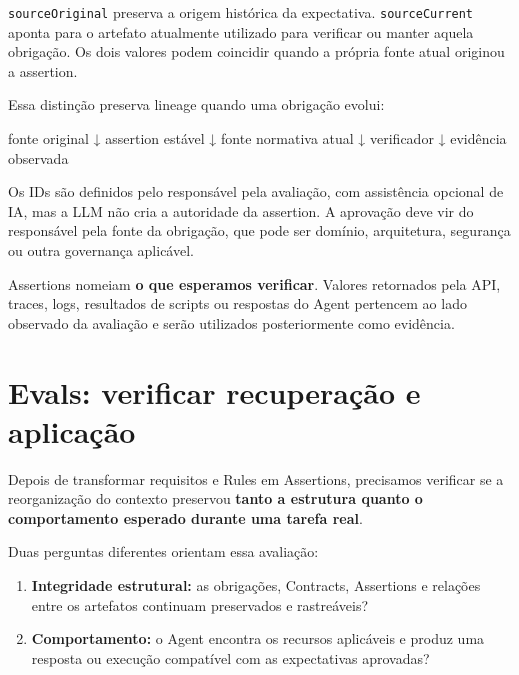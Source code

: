 \documentclass[
  10pt,
  a4paper,
  oneside]{book}
\newenvironment{Shaded}{}{}
\newcommand{\NormalTok}[1]{#1}
\providecommand{\tightlist}{%
  \setlength{\itemsep}{0pt}\setlength{\parskip}{0pt}}
\renewenvironment{Shaded}{\begin{snugshade}}{\end{snugshade}}%
\begin{document}
\texttt{sourceOriginal} preserva a origem histórica da expectativa.
\texttt{sourceCurrent} aponta para o artefato atualmente utilizado para
verificar ou manter aquela obrigação. Os dois valores podem coincidir
quando a própria fonte atual originou a assertion.

Essa distinção preserva lineage quando uma obrigação evolui:

\begin{Shaded}
\begin{Highlighting}[]
\NormalTok{fonte original}
\NormalTok{      ↓}
\NormalTok{assertion estável}
\NormalTok{      ↓}
\NormalTok{fonte normativa atual}
\NormalTok{      ↓}
\NormalTok{verificador}
\NormalTok{      ↓}
\NormalTok{evidência observada}
\end{Highlighting}
\end{Shaded}

Os IDs são definidos pelo responsável pela avaliação, com assistência
opcional de IA, mas a LLM não cria a autoridade da assertion. A
aprovação deve vir do responsável pela fonte da obrigação, que pode ser
domínio, arquitetura, segurança ou outra governança aplicável.

Assertions nomeiam \textbf{o que esperamos verificar}. Valores
retornados pela API, traces, logs, resultados de scripts ou respostas do
Agent pertencem ao lado observado da avaliação e serão utilizados
posteriormente como evidência.

\hypertarget{evals-verificar-recuperauxe7uxe3o-e-aplicauxe7uxe3o}{%
\section{Evals: verificar recuperação e
aplicação}\label{evals-verificar-recuperauxe7uxe3o-e-aplicauxe7uxe3o}}

Depois de transformar requisitos e Rules em Assertions, precisamos
verificar se a reorganização do contexto preservou \textbf{tanto a
estrutura quanto o comportamento esperado durante uma tarefa real}.

Duas perguntas diferentes orientam essa avaliação:

\begin{enumerate}
\def\labelenumi{\arabic{enumi}.}
\tightlist
\item
  \textbf{Integridade estrutural:} as obrigações, Contracts, Assertions
  e relações entre os artefatos continuam preservados e rastreáveis?
\item
  \textbf{Comportamento:} o Agent encontra os recursos aplicáveis e
  produz uma resposta ou execução compatível com as expectativas
  aprovadas?
\end{enumerate}
\end{document}
